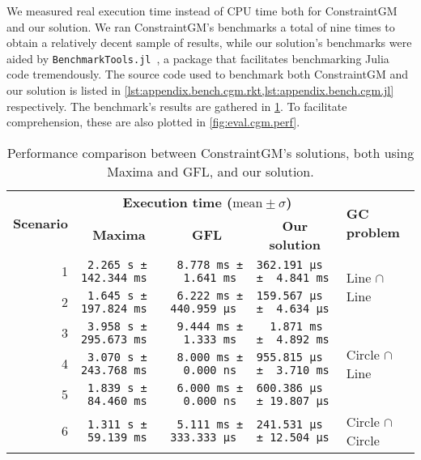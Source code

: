 We measured real execution time instead of \ac{CPU} time both for ConstraintGM
and our solution.  We ran ConstraintGM's benchmarks a total of nine times to
obtain a relatively decent sample of results, while our solution's benchmarks
were aided by \texttt{BenchmarkTools.jl}~\cite{Chen:2016:BenchmarkTools.jl}, a
package that facilitates benchmarking Julia code tremendously.  The source code
used to benchmark both ConstraintGM and our solution is listed in
\cref{lst:appendix.bench.cgm.rkt,lst:appendix.bench.cgm.jl} respectively.  The
benchmark's results are gathered in \cref{tab:eval.cgm.perf}.  To facilitate
comprehension, these are also plotted in \cref{fig:eval.cgm.perf}.

\begin{table}[htb]
  \caption[ConstraintGM performance benchmarks]{\label{tab:eval.cgm.perf}%
    Performance comparison between ConstraintGM's solutions, both using Maxima
    and \ac{GFL}, and our solution.}
  \footnotesize\centering
  \begin{tabular*}{\linewidth}{r*{3}{l}l}
    \toprule
    \multirow{2}{*}{\textbf{Scenario}}
    & \multicolumn{3}{c}{\textbf{Execution time ($\mathrm{mean}\pm\sigma$)}}
    & \multirow{2}{*}{\textbf{GC problem}} \\
    & \multicolumn{1}{c}{\textbf{Maxima}}
    & \multicolumn{1}{c}{\textbf{GFL}}
    & \multicolumn{1}{c}{\textbf{Our solution}} & \\
    \midrule
     1 & \texttt{~2.265 s ± 142.344 ms}
       & \texttt{~8.778 ms ± ~~1.641 ms}
       & \texttt{362.191 μs ± ~4.841 ms}
       & \multirow{2}{*}{Line $\cap$ Line}\\
     2 & \texttt{~1.645 s ± 197.824 ms}
       & \texttt{~6.222 ms ± 440.959 μs}
       & \texttt{159.567 μs ± ~4.634 μs} &\\
    \midrule
     3 & \texttt{~3.958 s ± 295.673 ms}
       & \texttt{~9.444 ms ± ~~1.333 ms}
       & \texttt{~~1.871 ms ± ~4.892 ms} 
       & \multirow{3}{*}{Circle $\cap$ Line}\\
     4 & \texttt{~3.070 s ± 243.768 ms}
       & \texttt{~8.000 ms ± ~~0.000 ns}
       & \texttt{955.815 μs ± ~3.710 ms} &\\
     5 & \texttt{~1.839 s ± ~84.460 ms}
       & \texttt{~6.000 ms ± ~~0.000 ns}
       & \texttt{600.386 μs ± 19.807 μs} &\\
    \midrule
     6 & \texttt{~1.311 s ± ~59.139 ms}
       & \texttt{~5.111 ms ± 333.333 μs}
       & \texttt{241.531 μs ± 12.504 μs} 
       & \multirow{8}{*}{Circle $\cap$ Circle}\\

\end{tabular*}
\end{table}
